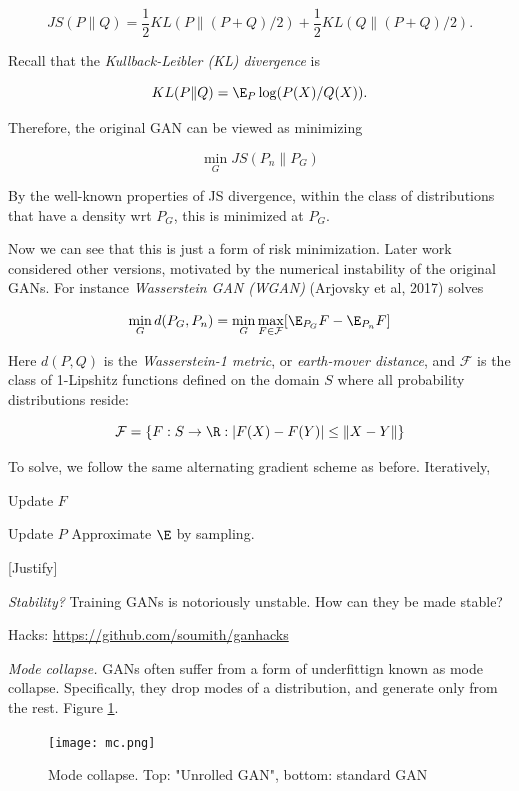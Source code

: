 \documentclass[english]{article}
\begin{document}
$$JS(P\| Q) = \frac12 KL(P\|(P+Q)/2)+ \frac12 KL(Q\|(P+Q)/2).$$ 

Recall that the \emph{Kullback-Leibler (KL) divergence} is 

$$KL(P\|Q) = \E_P \log(P(X)/Q(X)).$$


Therefore, the original GAN can be viewed as minimizing 

$$\min_G JS(P_n \| P_G) $$
 
By the well-known properties of JS divergence, within the class of distributions that have a density wrt $P_G$, this is minimized at $P_G$. 


\item Now we can see that this is just a form of risk minimization. Later work considered other versions, motivated by the numerical instability of the original GANs. For instance \emph{Wasserstein GAN (WGAN)} (Arjovsky et al, 2017) solves

$$ \min_{G} d(P_G ,P_n) =  \min_{G} \max_{F\in \mathcal{F}}[ \E_{P_G} F - \E_{P_n} F]$$

Here $d(P,Q)$ is the \emph{Wasserstein-1 metric}, or \emph{earth-mover distance}, and $ \mathcal{F}$ is the class of 1-Lipshitz functions defined on the domain $S$ where all probability distributions reside: 

$$\mathcal{F} = \{F: S \to \R: |F(X)- F(Y)| \le \|X-Y\|\}$$

To solve, we follow the same alternating gradient scheme as before. Iteratively, 
\benum
\item Update $F$
\item Update $P$
\eenum
Approximate $\E$ by sampling.

[Justify]

\item \emph{Stability?} Training GANs is notoriously unstable. How can they be made stable?

Hacks: \url{https://github.com/soumith/ganhacks}


\item \emph{Mode collapse.} GANs often suffer from a form of underfittign known as mode collapse. Specifically, they drop modes of a distribution, and generate only from the rest. Figure \ref{mc}. %

\begin{figure}
  \centering
  \texttt{[image: mc.png]}
    \caption{Mode collapse. Top: "Unrolled GAN", bottom: standard GAN}
    \label{mc}
\end{figure}
\end{document}
